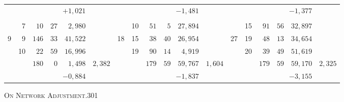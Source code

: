 \begin{center}
\begin{tabular}{|r|r|r@{\;}r@{\;}r|r||r|r|r@{\;}r@{\;}r|r||r|r|r@{\;}r@{\;}r|r|}
 &  & \multicolumn{3}{r|}{$+1{,}021$} &  &  &  & \multicolumn{3}{r|}{$-1{,}481$} &  &  &  & \multicolumn{3}{r|}{$-1{,}377$} & \\
 &  &  &  &  &  &  &  &  &  &  &  &  &  &  &  &  & \\
 & 7 & $10$ & $27$ & $2{,}980$ &  &  & 10 & $51$ & $5$ & $27{,}894$ &  &  & 15 & $91$ & $56$ & $32{,}897$ & \\
9 & 9 & $146$ & $33$ & $41{,}522$ &  & 18 & 15 & $38$ & $40$ & $26{,}954$ &  & 27 & 19 & $48$ & $13$ & $34{,}654$ & \\
 & 10 & $22$ & $59$ & $16{,}996$ &  &  & 19 & $90$ & $14$ & $4{,}919$ &  &  & 20 & $39$ & $49$ & $51{,}619$ & \\
\cline{3-5}\cline{9-11}\cline{15-17}
 &  & $180$ & $0$ & $1{,}498$ & $2{,}382$ &  &  & $179$ & $59$ & $59{,}767$ & $1{,}604$ &  &  & $179$ & $59$ & $59{,}170$ & $2{,}325$\\
 &  & \multicolumn{3}{r|}{$-0{,}884$} &  &  &  & \multicolumn{3}{r|}{$-1{,}837$} &  &  &  & \multicolumn{3}{r|}{$-3{,}155$} & \\
\end{tabular}
\endgroup
\end{center}
\noindent\hspace*{10cm}\raisebox{.4ex}{\scriptsize--}
\clearpage
\noindent\mbox{}\hfill\textsc{On Network Adjustment.}\hfill301\par\medskip
